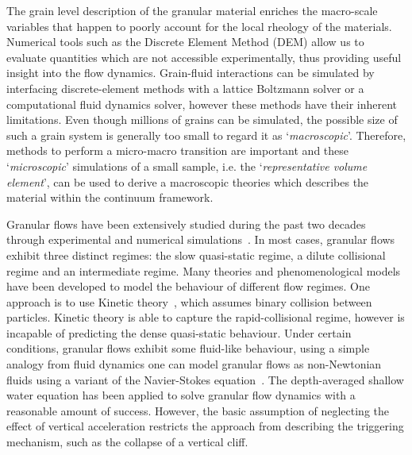 The grain level description of the granular material enriches the 
macro-scale variables that happen to poorly account for the local rheology of 
the materials. Numerical tools such as the Discrete Element Method (DEM) 
allow us to evaluate quantities which are not accessible experimentally, thus 
providing useful insight into the flow dynamics. Grain-fluid interactions can 
be simulated by interfacing discrete-element methods with a lattice 
Boltzmann solver or a computational fluid dynamics solver, however these 
methods have their inherent limitations. Even though millions of grains can be 
simulated, the possible size of such a grain system is generally too small 
to regard it as `\textit{macroscopic}'. Therefore, methods to perform a 
micro-macro transition are important and these `\textit{microscopic}' 
simulations of a small sample, i.e. the `\textit{representative volume 
element}', can be used to derive a macroscopic theories which describes the 
material within the continuum framework. 

Granular flows have been extensively studied during the past two decades 
through experimental and numerical 
simulations~\citep{Jaeger1996,Iverson1997a,Denlinger2001,Tang2013,Andersen2010}.
In most cases, granular flows exhibit three distinct regimes: the slow 
quasi-static regime, a dilute collisional regime and an intermediate regime. 
Many theories and phenomenological models have been developed to model the 
behaviour of different flow regimes. One approach is to use Kinetic 
theory~\citep{Jenkins1983, Savage1981}, which assumes binary collision between 
particles. Kinetic theory is able to capture the rapid-collisional regime, 
however is incapable of predicting the dense quasi-static behaviour. Under 
certain conditions, granular 
flows exhibit some fluid-like behaviour, using a simple analogy from fluid 
dynamics one can model granular flows as non-Newtonian fluids using a variant 
of the Navier-Stokes equation~\citep{Savage1991}. The depth-averaged shallow 
water equation has been applied to solve 
granular flow dynamics with a reasonable amount of success. However, the basic 
assumption of neglecting the effect of vertical acceleration restricts the 
approach from describing the triggering mechanism, such as the collapse of a 
vertical cliff.

